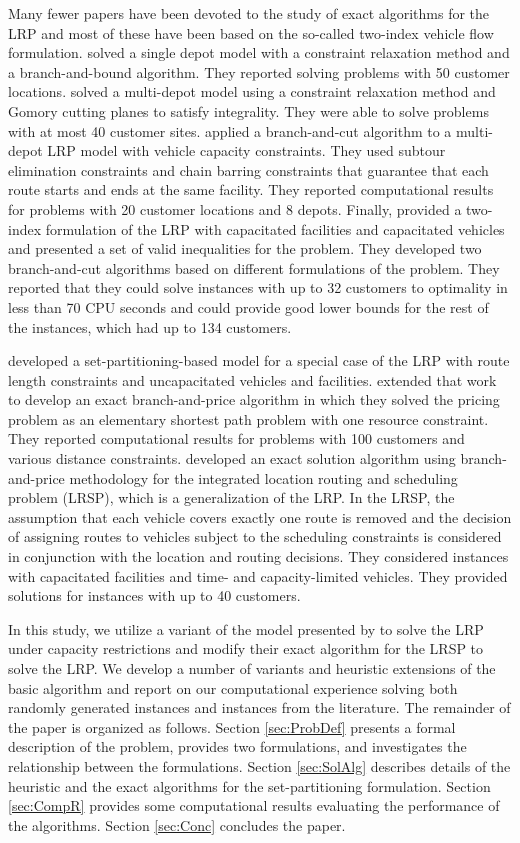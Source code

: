Many fewer papers have been devoted to the study of exact algorithms
for the LRP and most of these have been based on the so-called
two-index vehicle flow formulation. \citet{Laporte81} solved a single
depot model with a constraint relaxation method and a branch-and-bound
algorithm. They reported solving problems with 50 customer locations.
\citet{Laporte83} solved a multi-depot model using a constraint
relaxation method and Gomory cutting planes to satisfy integrality.
They were able to solve problems with at most 40 customer sites.
\citet{Laporte86} applied a branch-and-cut algorithm to a multi-depot
LRP model with vehicle capacity constraints. They used subtour
elimination constraints and chain barring constraints that guarantee
that each route starts and ends at the same facility. They reported
computational results for problems with 20 customer locations and 8
depots. Finally, \citet{Belenguer} provided a two-index formulation of
the LRP with capacitated facilities and capacitated vehicles and
presented a set of valid inequalities for the problem. They developed
two branch-and-cut algorithms based on different formulations of the
problem. They reported that they could solve instances with up to
32 customers to optimality in less than 70 CPU seconds and could provide
good lower bounds for the rest of the instances, which had up to 134
customers.

\citet{Berger} developed a set-partitioning-based model for a special
case of the LRP with route length constraints and uncapacitated
vehicles and facilities. \citet{Berger07} extended that work to
develop an exact branch-and-price algorithm in which they solved the
pricing problem as an elementary shortest path problem with one
resource constraint. They reported computational results for problems
with 100 customers and various distance constraints. \citet{Akca}
developed an exact solution algorithm using branch-and-price
methodology for the integrated location routing and scheduling problem
(LRSP), which is a generalization of the LRP. In the LRSP, the
assumption that each vehicle covers exactly one route is removed and
the decision of assigning routes to vehicles subject to the scheduling
constraints is considered in conjunction with the location and routing
decisions. They considered instances with capacitated facilities and
time- and capacity-limited vehicles. They provided solutions for
instances with up to 40 customers.
 
In this study, we utilize a variant of the model presented by
\citet{Akca} to solve the LRP under capacity restrictions and modify
their exact algorithm for the LRSP to solve the LRP. We develop a
number of variants and heuristic extensions of the basic algorithm and
report on our computational experience solving both randomly generated
instances and instances from the literature. The remainder of the
paper is organized as follows. Section \ref{sec:ProbDef} presents a
formal description of the problem, provides two formulations, and
investigates the relationship between the formulations. Section
\ref{sec:SolAlg} describes details of the heuristic and the exact
algorithms for the set-partitioning formulation. Section \ref{sec:CompR}
provides some computational results evaluating the performance of the
algorithms. Section \ref{sec:Conc} concludes the paper.

